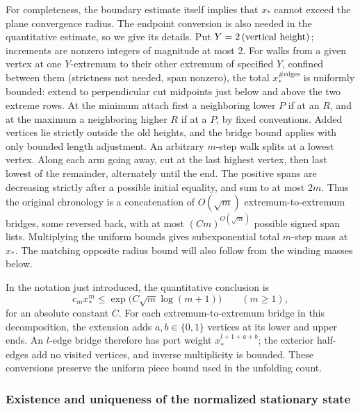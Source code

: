 For completeness, the boundary estimate itself implies that $x_*$ cannot
exceed the plane convergence radius. The endpoint conversion is also
needed in the quantitative estimate, so we give its details. Put \(Y=2\,({\rm vertical\ height})\); increments are nonzero integers of magnitude at most 2. For walks from a given vertex at one \(Y\)-extremum to their other extremum of specified \(Y\), confined between them (strictness not needed, span nonzero), the total \(x_*^{\#\mathrm{edges}}\) is uniformly bounded: extend to perpendicular cut midpoints just below and above the two extreme rows. At the minimum attach first a neighboring lower \(P\) if at an \(R\), and at the maximum a neighboring higher \(R\) if at a \(P\), by fixed conventions. Added vertices lie strictly outside the old heights, and the bridge bound applies with only bounded length adjustment. An arbitrary \(m\)-step walk splits at a lowest vertex. Along each arm going away, cut at the last highest vertex, then last lowest of the remainder, alternately until the end. The positive spans are decreasing strictly after a possible initial equality, and sum to at most \(2m\). Thus the original chronology is a concatenation of \(O(\sqrt{m})\) extremum-to-extremum bridges, some reversed back, with at most \((C m)^{O(\sqrt{m})}\) possible signed span lists. Multiplying the uniform bounds gives subexponential total \(m\)-step mass at \(x_*\). The matching opposite radius bound will also follow from the winding masses below.

In the notation just introduced, the quantitative conclusion is
\begin{equation}
 c_mx_*^m\le \exp\!\bigl(C\sqrt m\log(m+1)\bigr)
 \qquad(m\ge1),                                      \label{c4:unfolding}
\end{equation}
for an absolute constant $C$.  For each extremum-to-extremum bridge in
this decomposition, the extension adds $a,b\in\{0,1\}$ vertices at its
lower and upper ends.  An $l$-edge bridge therefore has port weight
$x_*^{l+1+a+b}$; the exterior half-edges add no visited vertices, and
inverse multiplicity is bounded.  These conversions preserve the uniform
piece bound used in the unfolding count.

\subsubsection{Existence and uniqueness of the normalized stationary state}

